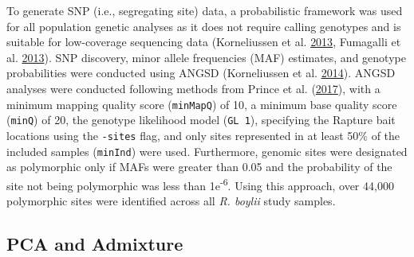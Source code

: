\documentclass[proquest,12pt,final]{ucthesis-CA2012} %
\begin{document}
\begin{ucmainmatter}
To generate SNP (i.e., segregating site) data, a probabilistic framework
was used for all population genetic analyses as it does not require
calling genotypes and is suitable for low-coverage sequencing data
(Korneliussen et al.
\protect\hyperlink{ref-korneliussen_calculation_2013}{2013}, Fumagalli
et al. \protect\hyperlink{ref-fumagalli_quantifying_2013}{2013}). SNP
discovery, minor allele frequencies (MAF) estimates, and genotype
probabilities were conducted using ANGSD (Korneliussen et al.
\protect\hyperlink{ref-korneliussen_angsd_2014}{2014}). ANGSD analyses
were conducted following methods from Prince et al.
(\protect\hyperlink{ref-prince_evolutionary_2017}{2017}), with a minimum
mapping quality score (\texttt{minMapQ}) of 10, a minimum base quality
score (\texttt{minQ}) of 20, the genotype likelihood model
(\texttt{GL\ 1}), specifying the Rapture bait locations using the
\texttt{-sites} flag, and only sites represented in at least 50\% of the
included samples (\texttt{minInd}) were used. Furthermore, genomic sites
were designated as polymorphic only if MAFs were greater than 0.05 and
the probability of the site not being polymorphic was less than
1e\textsuperscript{-6}. Using this approach, over 44,000 polymorphic
sites were identified across all \emph{R. boylii} study samples.

\hypertarget{pca-and-admixture}{%
\subsection{PCA and Admixture}\label{pca-and-admixture}}


\end{ucmainmatter}
\end{document}
